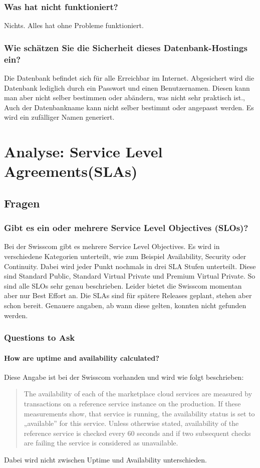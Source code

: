 \subsection{Was hat nicht funktioniert?}
Nichts. Alles hat ohne Probleme funktioniert. 
\subsection{Wie schätzen Sie die Sicherheit dieses Datenbank-Hostings ein?}
Die Datenbank befindet sich für alle Erreichbar im Internet. Abgesichert wird die Datenbank lediglich durch ein Passwort und einen Benutzernamen. Diesen kann man aber nicht selber bestimmen oder abändern, was nicht sehr praktisch ist., Auch der Datenbankname kann nicht selber bestimmt oder angepasst werden. Es wird ein zufälliger Namen generiert. 


\chapter{Analyse: Service Level Agreements(SLAs)} %
\section{Fragen}
\subsection{Gibt es ein oder mehrere Service Level Objectives (SLOs)?}
Bei der Swisscom gibt es mehrere Service Level Objectives. Es wird in verschiedene Kategorien unterteilt, wie zum Beispiel Availability, Security oder Continuity. Dabei wird jeder Punkt nochmals in drei SLA Stufen unterteilt. Diese sind Standard Public, Standard Virtual Private und Premium Virtual Private. So sind alle SLOs sehr genau beschrieben. Leider bietet die Swisscom momentan aber nur Best Effort an. Die SLAs sind für spätere Releases geplant, stehen aber schon bereit. Genauere angaben, ab wann diese gelten, konnten nicht gefunden werden. 
\subsection{Questions to Ask}
\subsubsection{How are uptime and availability calculated?}
Diese Angabe ist bei der Swisscom vorhanden und wird wie folgt beschrieben:
\begin{quote}
The availability of each of the marketplace cloud services are measured by transactions on a reference service
instance on the production. If these measurements show, that service is running, the availability status
is set to „available” for this service. Unless otherwise stated, availability of the reference service is
checked every 60 seconds and if two subsequent checks are failing the service is considered as unavailable.
\end{quote}
Dabei wird nicht zwischen Uptime und Availability unterschieden.
